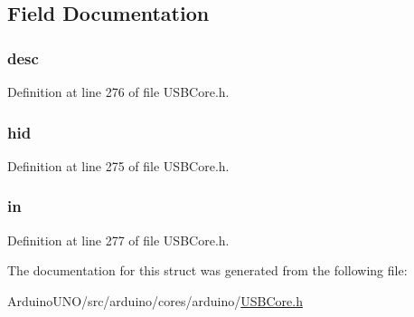 \subsection{Field Documentation}
\hypertarget{struct_h_i_d_descriptor_ae46b89dcb6c43addf455fc25ebbf9963}{}
\subsubsection[{desc}]{ desc}\label{struct_h_i_d_descriptor_ae46b89dcb6c43addf455fc25ebbf9963}


Definition at line 276 of file U\+S\+B\+Core.\+h.

\hypertarget{struct_h_i_d_descriptor_a81907e74fcb6fd20130a4a921e4be5fd}{}
\subsubsection[{hid}]{ hid}\label{struct_h_i_d_descriptor_a81907e74fcb6fd20130a4a921e4be5fd}


Definition at line 275 of file U\+S\+B\+Core.\+h.

\hypertarget{struct_h_i_d_descriptor_a93dcef3b3e3062b904269bcad94771b5}{}
\subsubsection[{in}]{ in}\label{struct_h_i_d_descriptor_a93dcef3b3e3062b904269bcad94771b5}


Definition at line 277 of file U\+S\+B\+Core.\+h.



The documentation for this struct was generated from the following file\+:\begin{DoxyCompactItemize}
\item 
Arduino\+U\+N\+O/src/arduino/cores/arduino/\hyperlink{_u_s_b_core_8h}{U\+S\+B\+Core.\+h}\end{DoxyCompactItemize}
